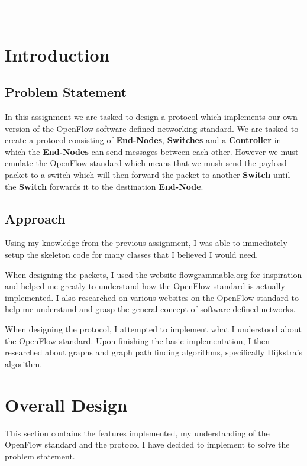 \documentclass{article}
\title{\textbf{\moduleCode\ \moduleName\ \assignmentTitle}}
\author{\authorName\ -\ \authorID}
\begin{document}
\captionsetup{width=.8\linewidth}

\maketitle
\tableofcontents

\newpage

\section{Introduction}

\subsection{Problem Statement}
In this assignment we are tasked to design a protocol which implements our own
version of the OpenFlow software defined networking standard. We are tasked to
create a protocol consisting of \textbf{End-Nodes}, \textbf{Switches} and a
\textbf{Controller} in which the \textbf{End-Nodes} can send messages between
each other. However we must emulate the OpenFlow standard which means that we
mush send the payload packet to a switch which will then forward the packet to
another \textbf{Switch} until the \textbf{Switch} forwards it to the destination
\textbf{End-Node}.

\subsection{Approach}
Using my knowledge from the previous assignment, I was able to immediately
setup the skeleton code for many classes that I believed I would need.

When designing the packets, I used the website
\href{http://flowgrammable.org/sdn/openflow/message-layer/}{flowgrammable.org}
for inspiration and helped me greatly to understand how the OpenFlow standard
is actually implemented. I also researched on various websites on the OpenFlow
standard to help me understand and grasp the general concept of software defined
networks.

When designing the protocol, I attempted to implement what I understood about
the OpenFlow standard. Upon finishing the basic implementation, I then
researched about graphs and graph path finding algorithms, specifically
Dijkstra's algorithm.

\section{Overall Design}
This section contains the features implemented, my understanding of the
OpenFlow standard and the protocol I have decided to implement to solve the
problem statement.
\end{document}
